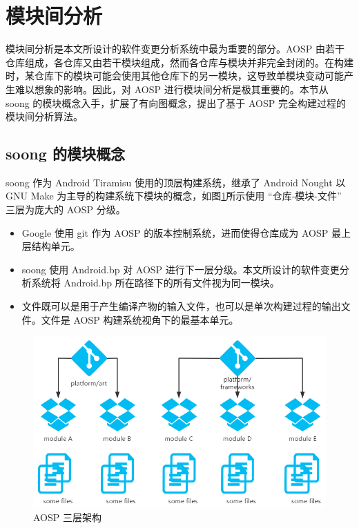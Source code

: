 \section{模块间分析}\label{intermodule-analysis}

模块间分析是本文所设计的软件变更分析系统中最为重要的部分。AOSP 由若干仓库组成，各仓库又由若干模块组成，然而各仓库与模块并非完全封闭的。在构建时，某仓库下的模块可能会使用其他仓库下的另一模块，这导致单模块变动可能产生难以想象的影响。因此，对 AOSP 进行模块间分析是极其重要的。本节从 soong 的模块概念入手，扩展了有向图概念，提出了基于 AOSP 完全构建过程的模块间分析算法。

\subsection{soong 的模块概念}

soong 作为 Android Tiramisu 使用的顶层构建系统，继承了 Android Nought 以 GNU Make 为主导的构建系统下模块的概念，如图\ref{fig:aosp-3-layer}所示使用 “仓库-模块-文件” 三层为庞大的 AOSP 分级。

\begin{itemize}
    \item Google 使用 git 作为 AOSP 的版本控制系统，进而使得仓库成为 AOSP 最上层结构单元。
    \item soong 使用 Android.bp 对 AOSP 进行下一层分级。本文所设计的软件变更分析系统将 Android.bp 所在路径下的所有文件视为同一模块。
    \item 文件既可以是用于产生编译产物的输入文件，也可以是单次构建过程的输出文件。文件是 AOSP 构建系统视角下的最基本单元。
\end{itemize}

\begin{figure}
    \centering
    \includegraphics[width=.8\textwidth]{figures/3-layer.png}
    \caption{AOSP 三层架构}
    \label{fig:aosp-3-layer}
\end{figure}

